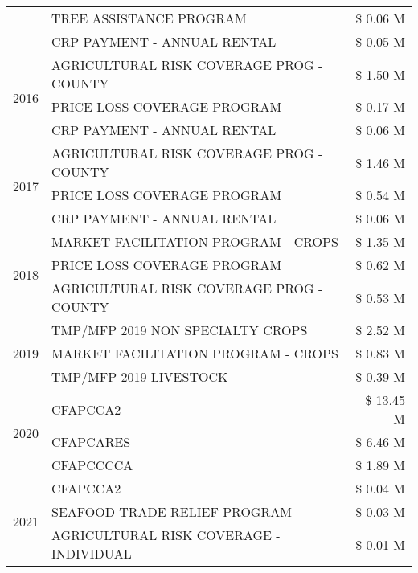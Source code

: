 \begin{tabular}{llr}
 & TREE ASSISTANCE PROGRAM & \$ 0.06 M \\
 & CRP PAYMENT - ANNUAL RENTAL & \$ 0.05 M \\
\cline{1-3}
\multirow[t]{3}{*}{2016} & AGRICULTURAL RISK COVERAGE PROG - COUNTY & \$ 1.50 M \\
 & PRICE LOSS COVERAGE PROGRAM & \$ 0.17 M \\
 & CRP PAYMENT - ANNUAL RENTAL & \$ 0.06 M \\
\cline{1-3}
\multirow[t]{3}{*}{2017} & AGRICULTURAL RISK COVERAGE PROG - COUNTY & \$ 1.46 M \\
 & PRICE LOSS COVERAGE PROGRAM & \$ 0.54 M \\
 & CRP PAYMENT - ANNUAL RENTAL & \$ 0.06 M \\
\cline{1-3}
\multirow[t]{3}{*}{2018} & MARKET FACILITATION PROGRAM - CROPS & \$ 1.35 M \\
 & PRICE LOSS COVERAGE PROGRAM & \$ 0.62 M \\
 & AGRICULTURAL RISK COVERAGE PROG - COUNTY & \$ 0.53 M \\
\cline{1-3}
\multirow[t]{3}{*}{2019} & TMP/MFP 2019 NON SPECIALTY CROPS & \$ 2.52 M \\
 & MARKET FACILITATION PROGRAM - CROPS & \$ 0.83 M \\
 & TMP/MFP 2019 LIVESTOCK & \$ 0.39 M \\
\cline{1-3}
\multirow[t]{3}{*}{2020} & CFAPCCA2 & \$ 13.45 M \\
 & CFAPCARES & \$ 6.46 M \\
 & CFAPCCCCA & \$ 1.89 M \\
\cline{1-3}
\multirow[t]{3}{*}{2021} & CFAPCCA2 & \$ 0.04 M \\
 & SEAFOOD TRADE RELIEF PROGRAM & \$ 0.03 M \\
 & AGRICULTURAL RISK COVERAGE - INDIVIDUAL & \$ 0.01 M \\
\cline{1-3}
\bottomrule
\end{tabular}
